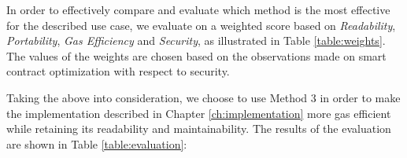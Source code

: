 

In order to effectively compare and evaluate which method is the most effective for the described use case, we evaluate on a weighted score based on \textit{Readability}, \textit{Portability}, \textit{Gas Efficiency} and \textit{Security}, as illustrated in Table \ref{table:weights}. The values of the weights are chosen based on the observations made on smart contract optimization with respect to security.



Taking the above into consideration, we choose to use Method 3 in order to make the implementation described in Chapter \ref{ch:implementation} more gas efficient while retaining its readability and maintainability. The results of the evaluation are shown in Table \ref{table:evaluation}:






